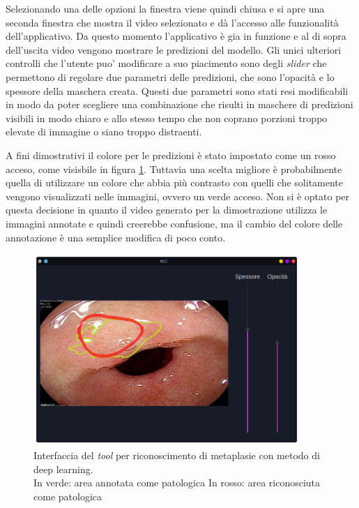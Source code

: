 Selezionando una delle opzioni la finestra viene quindi chiusa
e si apre una seconda finestra che mostra il video selezionato
e dà l'accesso alle funzionalità dell'applicativo.
Da questo momento l'applicativo è gia in funzione
e al di sopra dell'uscita video vengono mostrare le predizioni
del modello.
Gli unici ulteriori controlli che l'utente puo' modificare a
suo piacimento sono degli {\it slider} che permettono di
regolare due parametri delle predizioni, che sono
l'opacità e lo spessore della maschera creata.
Questi due parametri sono stati resi modificabili in modo
da poter scegliere una combinazione che risulti
in maschere di predizioni visibili in modo chiaro e allo
stesso tempo che non coprano porzioni troppo elevate di
immagine o siano troppo distraenti.

A fini dimostrativi il colore per le predizioni è stato 
impostato  come un rosso acceso, come visisbile
in figura \ref{fig:ui-screenshot}.
Tuttavia una scelta migliore è probabilmente quella di
utilizzare un colore che abbia più contrasto con quelli
che solitamente vengono visualizzati nelle immagini,
ovvero un verde acceso.
Non si è optato per questa decisione in quanto il video
generato per la dimostrazione utilizza le immagini
annotate e quindi creerebbe confusione, ma il cambio
del colore delle annotazione è una semplice modifica
di poco conto.

\begin{figure}
    \includegraphics[width=0.9\textwidth]{./assets/ui-screenshot.png}
    \caption{\label{fig:ui-screenshot} Interfaccia del {\it tool} per
    riconoscimento di metaplasie con metodo di deep learning.\\
    In verde: area annotata come patologica
    In rosso: area riconosciuta come patologica
    }
\end{figure}